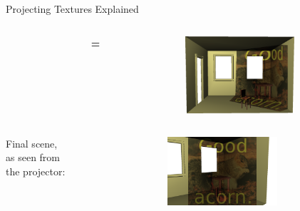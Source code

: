 \documentclass{beamer}
\begin{document}
\begin{frame}[t]{Projecting Textures Explained}
\begin{columns}[c]
\begin{column}{1.3in}
    \end{column}
    \begin{column}{0.1in}
      \Large{\textbf{=}}
    \end{column}
    \begin{column}{1.6in}
      \includegraphics[width=1.6in]{projector_room_yes}
    \end{column}
  \end{columns}

  \vspace{0.15in}

  \begin{columns}[c]
    \begin{column}{1in}
      Final scene,\\
      as seen from\\
      the projector:\\
    \end{column}
    \begin{column}{1.7in}
      \hspace{-0.75in}
      \includegraphics[width=1.6in]{projector_room_projector_view}
    \end{column}
  \end{columns}

\end{frame}
\end{document}
